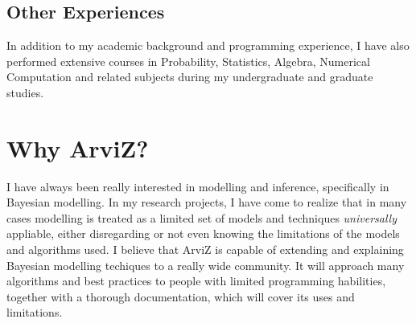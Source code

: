 \documentclass{article}
\begin{document}
\subsection{Other Experiences}\label{other-experiences}

In addition to my academic background and programming experience, I have
also performed extensive courses in Probability, Statistics, Algebra,
Numerical Computation and related subjects during my undergraduate and
graduate studies.

\section{Why ArviZ?}\label{why-arviz}

I have always been really interested in modelling and inference,
specifically in Bayesian modelling. In my research projects, I have come
to realize that in many cases modelling is treated as a limited set of
models and techniques \emph{universally} appliable, either disregarding
or not even knowing the limitations of the models and algorithms used. I
believe that ArviZ is capable of extending and explaining Bayesian
modelling techiques to a really wide community. It will approach many
algorithms and best practices to people with limited programming
habilities, together with a thorough documentation, which will cover its
uses and limitations.
\end{document}
